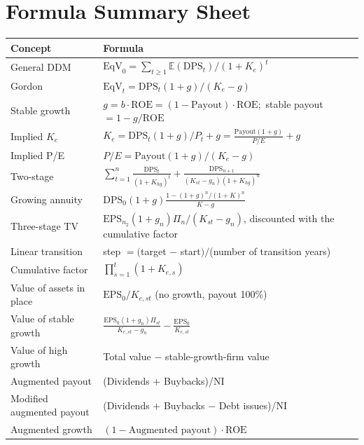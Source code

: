 \section{Formula Summary Sheet}
\begin{center}
\small
\renewcommand{\arraystretch}{1.5}
\begin{longtable}{@{}p{4.6cm}p{10.4cm}@{}}
\toprule
\textbf{Concept} & \textbf{Formula}\\
\midrule
\endhead
General DDM & $\text{EqV}_0=\sum_{t\geq1}\mathbb{E}(\text{DPS}_t)/(1+K_e)^t$\\
Gordon & $\text{EqV}_t=\text{DPS}_t(1+g)/(K_e-g)$\\
Stable growth & $g=b\cdot\text{ROE}=(1-\text{Payout})\cdot\text{ROE}$;\ stable payout $=1-g/\text{ROE}$\\
Implied $K_e$ & $K_e=\text{DPS}_t(1+g)/P_t+g=\frac{\text{Payout}(1+g)}{P/E}+g$\\
Implied P/E & $P/E=\text{Payout}(1+g)/(K_e-g)$\\
Two-stage & $\sum_{t=1}^n\frac{\text{DPS}_t}{(1+K_{hg})^t}+\frac{\text{DPS}_{n+1}}{(K_{st}-g_n)(1+K_{hg})^n}$\\
Growing annuity & $\text{DPS}_0(1+g)\frac{1-(1+g)^n/(1+K)^n}{K-g}$\\
Three-stage TV & $\text{EPS}_{n_2}(1+g_n)\Pi_n/(K_{st}-g_n)$, discounted with the cumulative factor\\
Linear transition & step $=($target $-$ start$)/$(number of transition years)\\
Cumulative factor & $\prod_{s=1}^{t}(1+K_{e,s})$\\
Value of assets in place & $\text{EPS}_0/K_{e,st}$ (no growth, payout 100\%)\\
Value of stable growth & $\frac{\text{EPS}_0(1+g_n)\Pi_{st}}{K_{e,st}-g_n}-\frac{\text{EPS}_0}{K_{e,st}}$\\
Value of high growth & Total value $-$ stable-growth-firm value\\
Augmented payout & (Dividends $+$ Buybacks)/NI\\
Modified augmented payout & (Dividends $+$ Buybacks $-$ Debt issues)/NI\\
Augmented growth & $(1-\text{Augmented payout})\cdot\text{ROE}$\\
\bottomrule
\end{longtable}
\end{center}

